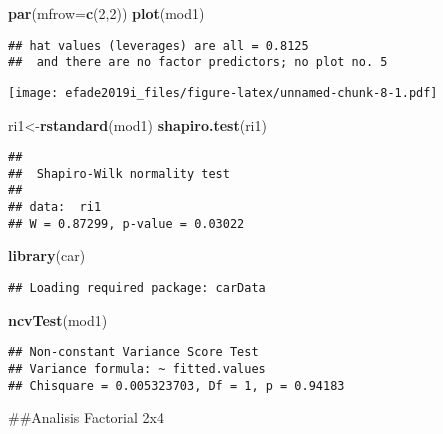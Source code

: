 \documentclass[]{article}
\newenvironment{Shaded}{\begin{snugshade}}{\end{snugshade}}
\newcommand{\DataTypeTok}[1]{\textcolor[rgb]{0.13,0.29,0.53}{#1}}
\newcommand{\DecValTok}[1]{\textcolor[rgb]{0.00,0.00,0.81}{#1}}
\newcommand{\KeywordTok}[1]{\textcolor[rgb]{0.13,0.29,0.53}{\textbf{#1}}}
\newcommand{\NormalTok}[1]{#1}
\begin{document}
\begin{Shaded}
\begin{Highlighting}[]
\KeywordTok{par}\NormalTok{(}\DataTypeTok{mfrow=}\KeywordTok{c}\NormalTok{(}\DecValTok{2}\NormalTok{,}\DecValTok{2}\NormalTok{))}
\KeywordTok{plot}\NormalTok{(mod1)}
\end{Highlighting}
\end{Shaded}

\begin{verbatim}
## hat values (leverages) are all = 0.8125
##  and there are no factor predictors; no plot no. 5
\end{verbatim}

\texttt{[image: efade2019i\_files/figure-latex/unnamed-chunk-8-1.pdf]}

\begin{Shaded}
\begin{Highlighting}[]
\NormalTok{ri1<-}\KeywordTok{rstandard}\NormalTok{(mod1)}
\KeywordTok{shapiro.test}\NormalTok{(ri1)}
\end{Highlighting}
\end{Shaded}

\begin{verbatim}
## 
##  Shapiro-Wilk normality test
## 
## data:  ri1
## W = 0.87299, p-value = 0.03022
\end{verbatim}

\begin{Shaded}
\begin{Highlighting}[]
\KeywordTok{library}\NormalTok{(car)}
\end{Highlighting}
\end{Shaded}

\begin{verbatim}
## Loading required package: carData
\end{verbatim}

\begin{Shaded}
\begin{Highlighting}[]
\KeywordTok{ncvTest}\NormalTok{(mod1)}
\end{Highlighting}
\end{Shaded}

\begin{verbatim}
## Non-constant Variance Score Test 
## Variance formula: ~ fitted.values 
## Chisquare = 0.005323703, Df = 1, p = 0.94183
\end{verbatim}

\#\#Analisis Factorial 2x4
\end{document}
